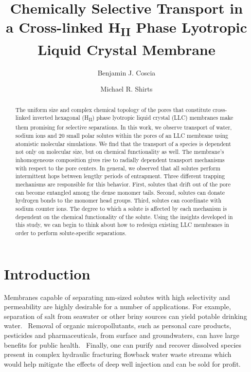 \documentclass[journal=jpcbfk,manuscript=article]{achemso}
\title{Chemically Selective Transport in a Cross-linked H\textsubscript{II} Phase Lyotropic Liquid Crystal Membrane}
\author{Benjamin J. Coscia}
\affiliation{Department of Chemical and Biological Engineering, University of Colorado Boulder, Boulder, CO 80309, USA}
\author{Michael R. Shirts}
\affiliation{Department of Chemical and Biological Engineering, University of Colorado Boulder, Boulder, CO 80309, USA}
\begin{document}
  \graphicspath{{./figures/}}
  
  \begin{abstract}

  The uniform size and complex chemical topology of the pores that 
  constitute cross-linked inverted hexagonal (H\textsubscript{II})
  phase lyotropic liquid crystal (LLC) membranes make them promising
  for selective separations. In this work, we observe transport
  of water, sodium ions and 20 small polar solutes within the pores 
  of an LLC membrane using atomistic molecular simulations. We 
  find that the transport of a species is dependent not only on 
  molecular size, but on chemical functionality as well. The 
  membrane's inhomogeneous composition gives rise to radially dependent
  transport mechanisms with respect to the pore centers. In general, we 
  observed that all solutes perform intermittent hops between lengthy
  periods of entrapment. Three different trapping mechanisms are 
  responsible for this behavior. First, solutes that drift
  out of the pore can become entangled among the dense monomer
  tails. Second, solutes can donate hydrogen bonds to the monomer
  head groups. Third, solutes can coordinate with sodium counter ions.
  The degree to which a solute is affected by each mechanism is 
  dependent on the chemical functionality of the solute. Using the
  insights developed in this study, we can begin to think about 
  how to redesign existing LLC membranes in order to perform 
  solute-specific separations.
   
  \end{abstract}

  \section{Introduction}

  Membranes capable of separating nm-sized solutes with high selectivity 
  and permeability are highly desirable for a number of applications. For 
  example, separation of salt from seawater or other briny sources can 
  yield potable drinking water.~\cite{fritzmann_state---art_2007} Removal
  of organic micropollutants, such as personal care products, pesticides
  and pharmaceuticals, from surface and groundwaters, can have large benefits
  for public health.~\cite{schwarzenbach_challenge_2006} Finally,
  one can purify and recover dissolved species present in complex
  hydraulic fracturing flowback water waste streams which would help mitigate
  the effects of deep well injection and can be sold for profit.~\cite{dischinger_application_2017} 
  
\end{document}
